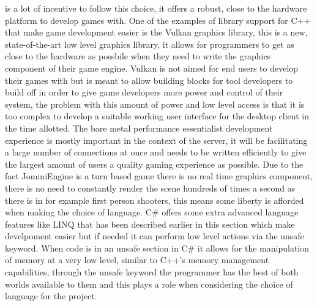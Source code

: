 \documentclass{article}
\begin{document}
is a lot of incentive to follow this choice, it offers a robust, close to the hardware platform to develop games with. One of the examples of library support for C++ that make game development easier is the Vulkan graphics library\cite{vulkan}, this is a new, state-of-the-art low level graphics library, it allows for programmers to get as close to the hardware as possbile when they need to write the graphics component of their game engine. Vulkan is not aimed for end users to develop their games with but is meant to allow building blocks for tool developers to build off in order to give game developers more power and control of their system, the problem with this amount of power and low level access is that it is too complex to develop a suitable working user interface for the desktop client in the time allotted. The bare metal performance essentialist development experience is mostly important in the context of the server, it will be facilitating a large number of connections at once and needs to be written efficiently to give the largest amount of users a quality gaming experience as possible. Due to the fact JominiEngine is a turn based game there is no real time graphics component, there is no need to constantly render the scene hundreds of times a second as there is in for example first person shooters, this means some liberty is afforded when making the choice of language. C\# offers some extra advanced language features like LINQ that has been described earlier in this section which make develpoment easier but if needed it can perform low level actions via the unsafe keyword\cite{unsafe}. When code is in an unsafe section in C\# it allows for the manipulation of memory at a very low level, similar to C++'s memory management capabilities, through the unsafe keyword the programmer has the best of both worlds available to them and this plays a role when considering the choice of language for the project.
\end{document}
